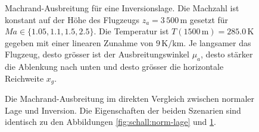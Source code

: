 \begin{figure}
    \centering
{}
    \caption{Machrand-Ausbreitung für eine Inversionslage. Die Machzahl
    ist konstant auf der Höhe des Flugzeugs $z_a=3\,500$\,m gesetzt für
    $\textit{Ma} \in \{1.05, 1.1, 1.5, 2.5 \}$.
    Die Temperatur ist $T(1500\,\textrm{m}) = 285.0\,\mathrm{K}$ gegeben mit einer
    linearen Zunahme von $9\,\mathrm{K/km}$.
    Je langsamer das Flugzeug, desto grösser ist der Ausbreitungswinkel
    $\mu_a$, desto stärker die Ablenkung nach unten und desto
    grösser die horizontale Reichweite $x_g$.}
    \label{fig:schall:inv-lage}
\end{figure}

\begin{figure}
    \centering
{}
    \caption{Die Machrand-Ausbreitung im direkten Vergleich zwischen
    normaler Lage und Inversion. Die Eigenschaften der beiden Szenarien
    sind identisch zu den Abbildungen \ref{fig:schall:norm-lage}
    und \ref{fig:schall:inv-lage}.}
    \label{fig:schall:norm-vs-inv-lage}
\end{figure}
